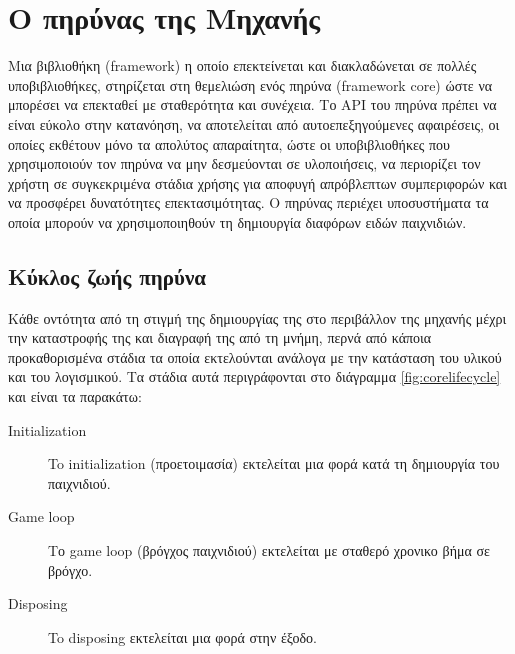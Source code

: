 	\chapter{Ο πηρύνας της Μηχανής}
	
	Μια βιβλιοθήκη (framework) η οποίο επεκτείνεται και διακλαδώνεται σε πολλές υποβιβλιοθήκες, στηρίζεται στη θεμελιώση ενός πηρύνα (framework core) ώστε να μπορέσει να επεκταθεί με σταθερότητα και συνέχεια. Το \gls{API} του πηρύνα πρέπει να είναι εύκολο στην κατανόηση, να αποτελείται από αυτοεπεξηγούμενες αφαιρέσεις, οι οποίες εκθέτουν μόνο τα απολύτος απαραίτητα, ώστε οι υποβιβλιοθήκες που χρησιμοποιούν τον πηρύνα να μην δεσμεύονται σε υλοποιήσεις, να περιορίζει τον χρήστη σε συγκεκριμένα στάδια χρήσης για αποφυγή απρόβλεπτων συμπεριφορών και να προσφέρει δυνατότητες επεκτασιμότητας.  \cite{jaroslav08} Ο πηρύνας περιέχει υποσυστήματα τα οποία μπορούν να χρησιμοποιηθούν τη δημιουργία διαφόρων ειδών παιχνιδιών.
		
	\section{Κύκλος ζωής πηρύνα}	
	Κάθε οντότητα από τη στιγμή της δημιουργίας της στο περιβάλλον της μηχανής μέχρι την καταστροφής της και διαγραφή της από τη μνήμη, περνά από κάποια προκαθορισμένα στάδια τα οποία εκτελούνται ανάλογα με την κατάσταση του υλικού και του λογισμικού. Τα στάδια αυτά περιγράφονται στο διάγραμμα \ref{fig:corelifecycle} και είναι τα παρακάτω:
	
	\begin{description}
		\item [Initialization] To initialization (προετοιμασία) εκτελείται μια φορά κατά τη δημιουργία του παιχνιδιού.
		\item [Game loop] Το game loop (βρόγχος παιχνιδιού) εκτελείται με σταθερό χρονικο βήμα σε βρόγχο.
		\item [Disposing] To disposing εκτελείται μια φορά στην έξοδο. 
	\end{description}
	
